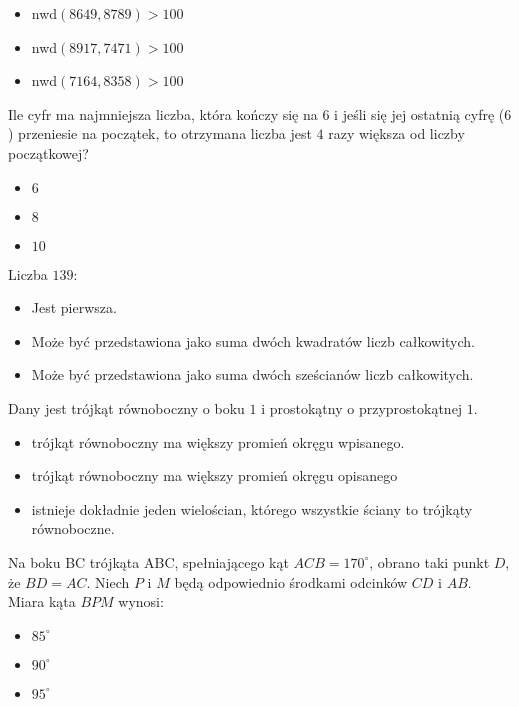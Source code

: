 \documentclass[12pt, a4paper]{article}
\newcommand{\question}[1]{\normalitem \begin{samepage}#1 \end{samepage}}
\begin{document}
\begin{enumerate}
{		\begin{itemize}
			\item nwd$(8649,8789) > 100$
			\item nwd$(8917,7471)>100$
			\item nwd$(7164,8358)>100$
		\end{itemize}
	}
	
	\question{
	    Ile cyfr ma najmniejsza liczba, która kończy się na $6$ i jeśli się jej ostatnią cyfrę ($6$) przeniesie na początek, to otrzymana liczba jest $4$ razy większa od liczby początkowej?

		\begin{itemize}
			\item $6$
			\item $8$
			\item $10$
		\end{itemize}
	}
	
	\question {
		Liczba $139$:

		\begin{itemize}
			\item Jest pierwsza.
			\item Może być przedstawiona jako suma dwóch kwadratów liczb całkowitych.
			\item Może być przedstawiona jako suma dwóch sześcianów liczb całkowitych.
		\end{itemize}
	}
	
	\question {
		Dany jest trójkąt równoboczny o boku $1$ i prostokątny o przyprostokątnej $1$.

    	\begin{itemize}
			\item trójkąt równoboczny ma większy promień okręgu wpisanego.
			\item trójkąt równoboczny ma większy promień okręgu opisanego
			\item istnieje dokładnie jeden wielościan, którego wszystkie ściany to trójkąty równoboczne.
		\end{itemize}
	}
	
	\question {
		Na boku BC trójkąta ABC, spełniającego kąt $ACB = 170^{\circ}$, obrano taki punkt $D$, że $BD = AC$. Niech $P$ i $M$ będą odpowiednio środkami odcinków $CD$ i $AB$. Miara kąta $BPM$ wynosi:

		\begin{itemize}
			\item $85^{\circ}$
			\item $90^{\circ}$
			\item $95^{\circ}$
		\end{itemize}
	}
	

\end{enumerate}
\end{document}
